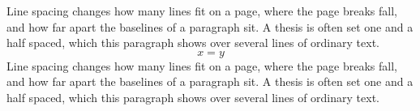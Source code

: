 \documentclass[11pt]{article}
\begin{document}
Line spacing changes how many lines fit on a page, where the page breaks fall, and how far apart the baselines of a paragraph sit. A thesis is often set one and a half spaced, which this paragraph shows over several lines of ordinary text.
$$ x = y $$
Line spacing changes how many lines fit on a page, where the page breaks fall, and how far apart the baselines of a paragraph sit. A thesis is often set one and a half spaced, which this paragraph shows over several lines of ordinary text.
\end{document}
